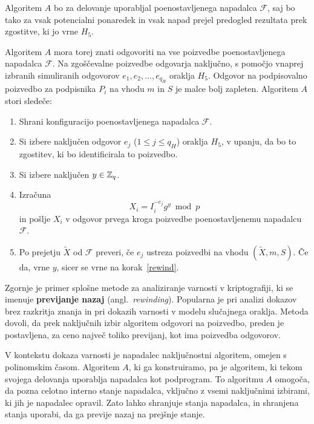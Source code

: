 \begin{dokaz}
Algoritem $A$ bo za delovanje uporabljal poenostavljenega napadalca $\mathcal{F}$, saj bo tako za
vsak potencialni ponaredek in vsak napad prejel predogled rezultata prek zgostitve, ki jo vrne $H_5$.

Algoritem $A$ mora torej znati odgovoriti na vse poizvedbe poenostavljenega napadalca $\mathcal{F}$.
Na zgoščevalne poizvedbe odgovarja naključno, s pomočjo vnaprej izbranih simuliranih odgovorov $e_1,
e_2, \dots, e_{q_H}$ oraklja $H_5$. Odgovor na podpisovalno poizvedbo za podpisnika $P_i$ na vhodu
$m$ in $S$ je malce bolj zapleten. Algoritem $A$ stori sledeče:
\begin{enumerate}
    \item Shrani konfiguracijo poenostavljenega napadalca $\mathcal{F}$.
    \item \label{rewind} Si izbere naključen odgovor $e_j$ ($1 \le j \le q_H$) oraklja $H_5$, 
        v upanju, da bo to zgostitev, ki bo identificirala to poizvedbo.
    \item Si izbere naključen $y \in \mathbb Z_q$.
    \item Izračuna 
        $$
        X_i = I_i^{-e_j}g^y \bmod p
        $$
        in pošlje $X_i$ v odgovor prvega kroga poizvedbe poenostavljenemu napadalcu $\mathcal{F}$.
    \item Po prejetju $\tilde{X}$ od $\mathcal{F}$ preveri, če $e_j$ ustreza poizvedbi na vhodu
        $(\tilde{X}, m, S)$. Če da, vrne $y$, sicer se vrne na korak~\ref{rewind}.
\end{enumerate}
Zgornje je primer splošne metode za analiziranje varnosti v kriptografiji, ki se imenuje 
\textbf{previjanje nazaj} (angl.\ \textit{rewinding}). Popularna je pri analizi dokazov brez razkritja
znanja in pri dokazih varnosti v modelu slučajnega oraklja. Metoda dovoli, da prek naključnih izbir
algoritem odgovori na poizvedbo, preden je postavljena, za ceno največ toliko previjanj, kot ima
poizvedba odgovorov.

\begin{opomba}
    V kontekstu dokaza varnosti je napadalec naključnostni algoritem, omejen s polinomskim časom.
    Algoritem $A$, ki ga konstruiramo, pa je algoritem, ki tekom svojega delovanja uporablja
    napadalca kot podprogram. To algoritmu $A$ omogoča, da pozna celotno interno stanje
    napadalca, vključno z vsemi naključnimi izbirami, ki jih je napadalec opravil. Zato lahko
    shranjuje stanja napadalca, in shranjena stanja uporabi, da ga previje nazaj na prejšnje stanje.
\end{opomba}


\end{dokaz}
